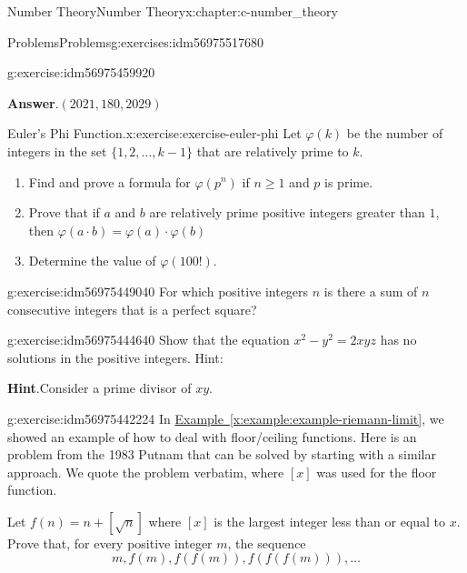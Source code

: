 \documentclass[twoside,10pt,]{book}
\newcommand{\blocktitlefont}{\relax}
\newcommand{\xreffont}{\relax}
\numberwithin{equation}{section}
\begin{document}
\begin{chapterptx}{Number Theory}{}{Number Theory}{}{}{x:chapter:c-number_theory}
\begin{exercises-section}{Problems}{}{Problems}{}{}{g:exercises:idm56975517680}
\begin{divisionexercise}{4}{}{}{g:exercise:idm56975459920}
\par\smallskip%
\noindent\textbf{\blocktitlefont Answer}.\hypertarget{g:answer:idm56975457664}{}\quad{}\((2021,180,2029)\)%
\end{divisionexercise}%
\begin{divisionexercise}{5}{Euler's Phi Function.}{}{x:exercise:exercise-euler-phi}%
%
Let \(\varphi(k)\) be the number of integers in the set \(\{1,2, \ldots  , k-1\}\) that are relatively prime to \(k\).%
\begin{enumerate}[label=(\alph*)]
\item{}Find and prove a formula for \(\varphi \left(p^n\right)\) if \(n\geq 1\) and \(p\) is prime.%
\item{}Prove that if \(a\) and \(b\) are relatively prime positive integers greater than \(1\), then  \(\varphi(a \cdot b)=\varphi(a) \cdot \varphi(b)\)%
\item{}Determine the value of \(\varphi(100!)\).%
\end{enumerate}
%
\end{divisionexercise}%
\begin{divisionexercise}{6}{}{}{g:exercise:idm56975449040}%
For which positive integers \(n\) is there a sum of \(n\) consecutive integers that is a perfect square?%
\end{divisionexercise}%
\begin{divisionexercise}{7}{}{}{g:exercise:idm56975444640}%
Show that the equation \(x^2- y^2=2x y z\) has no solutions in the positive integers. Hint:%
\par\smallskip%
\noindent\textbf{\blocktitlefont Hint}.\hypertarget{g:hint:idm56975443072}{}\quad{}Consider a prime divisor of \(x y\).%
\end{divisionexercise}%
\begin{divisionexercise}{8}{}{}{g:exercise:idm56975442224}%
In \hyperref[x:example:example-riemann-limit]{Example~{\xreffont\ref{x:example:example-riemann-limit}}}, we showed an example of how to deal with floor\slash{}ceiling functions. Here is an problem from the 1983 Putnam that can be solved by starting with a similar approach.  We quote the problem verbatim, where \([x]\) was used for the floor function.%
\par
Let \(f(n)=n +[\sqrt{n}]\) where \([x]\) is the largest integer less than or equal to \(x\).  Prove that, for every positive integer \(m\), the sequence%
\begin{equation*}
m, f(m), f(f(m)), f(f(f(m))), \dots
\end{equation*}

\end{divisionexercise}
\end{exercises-section}
\end{chapterptx}
\end{document}
